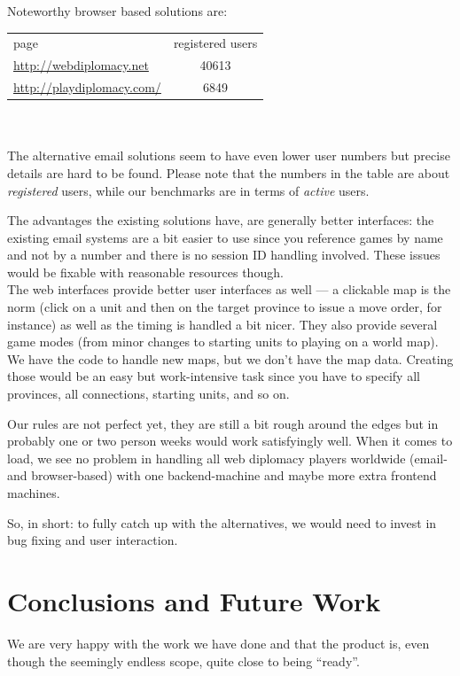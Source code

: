 \documentclass[11pt,a4paper]{report}
\begin{document}
Noteworthy browser based solutions are:\\

\begin{tabular}{lc}
  page                            & registered users \\
  \url{http://webdiplomacy.net}   & 40613 \\
  \url{http://playdiplomacy.com/} & 6849
\end{tabular}
\\
\\The alternative email solutions seem to have even lower user numbers but
precise details are hard to be found. Please note that the numbers in
the table are about {\em registered\/} users, while our benchmarks are in terms
of {\em active\/} users.

The advantages the existing solutions have, are generally better interfaces:
the existing email systems are a bit easier to use since you reference games by
name and not by a number and there is no session ID handling involved.
These issues would be fixable with reasonable resources though. \\
The web interfaces provide better user interfaces as well --- a clickable map
is the norm (click on a unit and then on the target province to issue a move
order, for instance) as well as the timing is handled a bit nicer. They also
provide several game modes (from minor changes to starting units to playing on
a world map). We have the code to handle new maps, but we don't have the map
data. Creating those would be an easy but work-intensive task since you have
to specify all provinces, all connections, starting units, and so on.

Our rules are not perfect yet, they are still a bit rough around the edges but
in probably one or two person weeks would work satisfyingly well.
When it comes to load, we see no problem in handling all web diplomacy
players worldwide (email- and browser-based) with one backend-machine and maybe
more extra frontend machines.

So, in short: to fully catch up with the alternatives, we would need to invest
in bug fixing and user interaction.

\chapter{Conclusions and Future Work}
We are very happy with the work we have done and that the product is, even
though the seemingly endless scope, quite close to being ``ready''.
\end{document}
